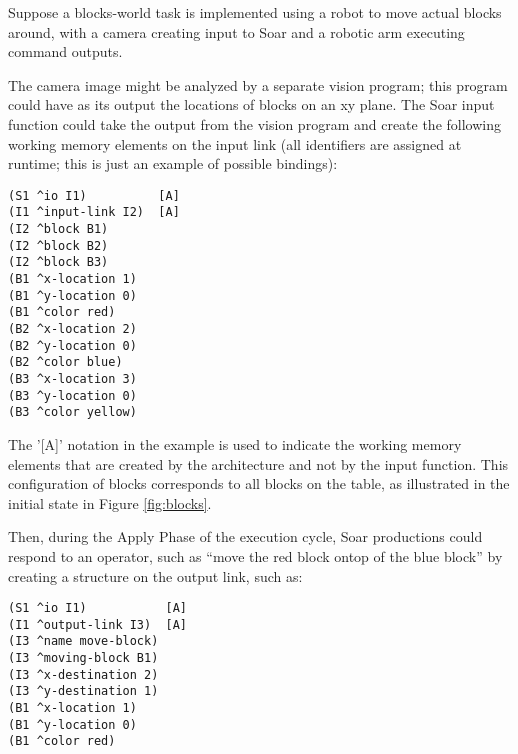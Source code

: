 Suppose a blocks-world task is implemented using a robot to move actual blocks around, with a camera creating input to Soar and a robotic arm executing command outputs. 

\begin{figure}
	\label{fig:blocks-inputlink}
\end{figure}

The camera image might be analyzed by a separate vision program; this program could have as its output the locations of blocks on an xy plane. The Soar input function could take the output from the vision program and create the following working memory elements on the input link (all identifiers are assigned at runtime; this is just an example of possible bindings):

\begin{verbatim}
(S1 ^io I1)          [A]
(I1 ^input-link I2)  [A]
(I2 ^block B1)
(I2 ^block B2)
(I2 ^block B3)
(B1 ^x-location 1)
(B1 ^y-location 0)
(B1 ^color red)
(B2 ^x-location 2)
(B2 ^y-location 0)
(B2 ^color blue)
(B3 ^x-location 3)
(B3 ^y-location 0)
(B3 ^color yellow)
\end{verbatim} 
\vspace{6pt}

The '[A]' notation in the example is used to indicate the working memory elements that are created by the architecture and not by the input function. This configuration of blocks corresponds to all blocks on the table, as illustrated in the initial state in Figure \ref{fig:blocks}.

\begin{figure}
	\label{fig:blocks-outputlink}
\end{figure}

Then, during the Apply Phase of the execution cycle, Soar productions could respond to an operator, such as ``move the red block ontop of the blue block'' by creating a structure on the output link, such as:

\begin{verbatim}
(S1 ^io I1)           [A]
(I1 ^output-link I3)  [A]
(I3 ^name move-block)
(I3 ^moving-block B1)
(I3 ^x-destination 2)
(I3 ^y-destination 1)
(B1 ^x-location 1)
(B1 ^y-location 0)
(B1 ^color red)
\end{verbatim}  
\vspace{12pt}

